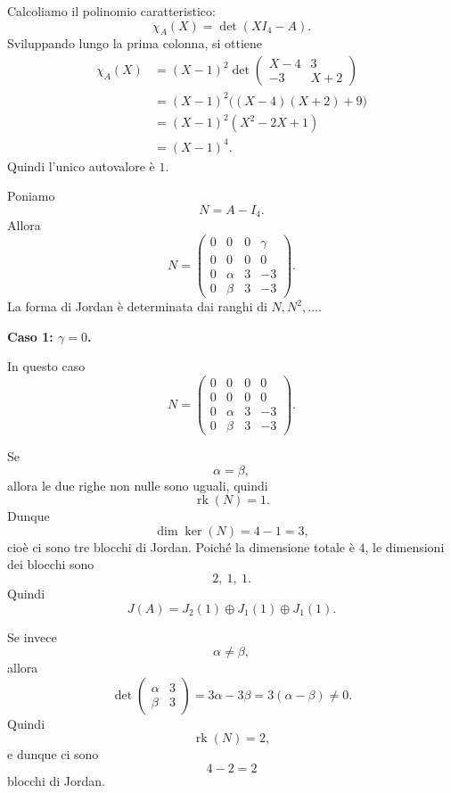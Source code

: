 \documentclass[a4paper]{article}
\begin{document}
\begin{radioactive}
\begin{snippetsolution}{}
    Calcoliamo il polinomio caratteristico:
    \[
        \chi_A(X)
        =
        \det(XI_4-A).
    \]
    Sviluppando lungo la prima colonna, si ottiene
    \begin{align*}
        \chi_A(X)
        &=
        (X-1)^2
        \det
        \begin{pmatrix}
            X-4 & 3\\
            -3 & X+2
        \end{pmatrix} \\
        &=
        (X-1)^2\big((X-4)(X+2)+9\big) \\
        &=
        (X-1)^2(X^2-2X+1) \\
        &=
        (X-1)^4.
    \end{align*}
    Quindi l'unico autovalore è \(1\).

    Poniamo
    \[
        N=A-I_4.
    \]
    Allora
    \[
        N=
        \begin{pmatrix}
            0 & 0 & 0 & \gamma\\
            0 & 0 & 0 & 0\\
            0 & \alpha & 3 & -3\\
            0 & \beta & 3 & -3
        \end{pmatrix}.
    \]
    La forma di Jordan è determinata dai ranghi di \(N,N^2,\ldots\).

    \textbf{Caso 1: \(\gamma=0\).}

    In questo caso
    \[
        N=
        \begin{pmatrix}
            0 & 0 & 0 & 0\\
            0 & 0 & 0 & 0\\
            0 & \alpha & 3 & -3\\
            0 & \beta & 3 & -3
        \end{pmatrix}.
    \]

    Se
    \[
        \alpha=\beta,
    \]
    allora le due righe non nulle sono uguali, quindi
    \[
        \operatorname{rk}(N)=1.
    \]
    Dunque
    \[
        \dim\ker(N)=4-1=3,
    \]
    cioè ci sono tre blocchi di Jordan. Poiché la dimensione totale è \(4\), le dimensioni dei blocchi sono
    \[
        2,\ 1,\ 1.
    \]
    Quindi
    \[
        J(A)=J_2(1)\oplus J_1(1)\oplus J_1(1).
    \]

    Se invece
    \[
        \alpha\neq \beta,
    \]
    allora
    \[
        \det
        \begin{pmatrix}
            \alpha & 3\\
            \beta & 3
        \end{pmatrix}
        =
        3\alpha-3\beta
        =
        3(\alpha-\beta)\neq 0.
    \]
    Quindi
    \[
        \operatorname{rk}(N)=2,
    \]
    e dunque ci sono
    \[
        4-2=2
    \]
    blocchi di Jordan.


\end{snippetsolution}
\end{radioactive}
\end{document}
